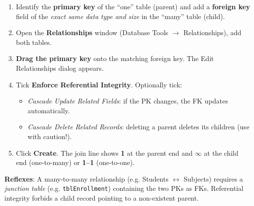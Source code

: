 \documentclass[11pt]{article}
\begin{document}
\begin{methode}
\begin{enumerate}
\item Identify the \textbf{primary key} of the ``one'' table (parent) and add a \textbf{foreign key} field of the \emph{exact same data type and size} in the ``many'' table (child).
\item Open the \textbf{Relationships} window (Database Tools $\rightarrow$ Relationships), add both tables.
\item \textbf{Drag the primary key} onto the matching foreign key. The Edit Relationships dialog appears.
\item Tick \textbf{Enforce Referential Integrity}. Optionally tick:
\begin{itemize}
\item \emph{Cascade Update Related Fields}: if the PK changes, the FK updates automatically.
\item \emph{Cascade Delete Related Records}: deleting a parent deletes its children (use with caution!).
\end{itemize}
\item Click \textbf{Create}. The join line shows \textbf{1} at the parent end and \textbf{$\infty$} at the child end (one-to-many) or \textbf{1--1} (one-to-one).
\end{enumerate}
\textbf{Reflexes}: A many-to-many relationship (e.g. Students $\leftrightarrow$ Subjects) requires a \emph{junction table} (e.g. \texttt{tblEnrollment}) containing the two PKs as FKs. Referential integrity forbids a child record pointing to a non-existent parent.
\end{methode}
\end{document}
